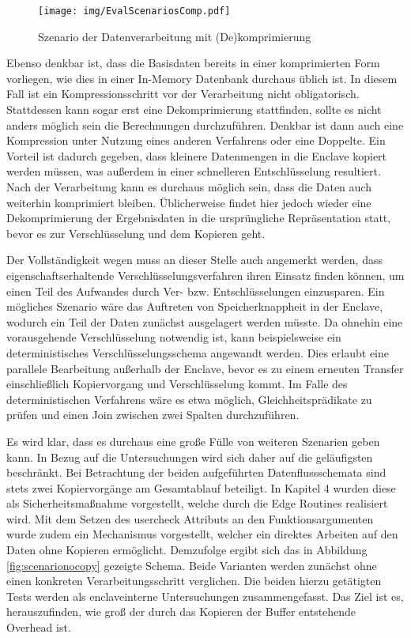 \begin{figure}[h]
	\texttt{[image: img/EvalScenariosComp.pdf]}
	\centering
	\caption{Szenario der Datenverarbeitung mit (De)komprimierung}
	\label{fig:scenariocomp}
\end{figure}

Ebenso denkbar ist, dass die Basisdaten bereits in einer komprimierten Form vorliegen, wie dies in einer In-Memory Datenbank durchaus üblich ist. In diesem Fall ist ein Kompressionsschritt vor der Verarbeitung nicht obligatorisch. Stattdessen kann sogar erst eine Dekomprimierung stattfinden, sollte es nicht anders möglich sein die Berechnungen durchzuführen. Denkbar ist dann auch eine Kompression unter Nutzung eines anderen Verfahrens oder eine Doppelte. Ein Vorteil ist dadurch gegeben, dass kleinere Datenmengen in die Enclave kopiert werden müssen, was außerdem in einer schnelleren Entschlüsselung resultiert. Nach der Verarbeitung kann es durchaus möglich sein, dass die Daten auch weiterhin komprimiert bleiben. Üblicherweise findet hier jedoch wieder eine Dekomprimierung der Ergebnisdaten in die ursprüngliche Repräsentation statt, bevor es zur Verschlüsselung und dem Kopieren geht.

Der Vollständigkeit wegen muss an dieser Stelle auch angemerkt werden, dass eigenschaftserhaltende Verschlüsselungsverfahren ihren Einsatz finden können, um einen Teil des Aufwandes durch Ver- bzw. Entschlüsselungen einzusparen. Ein mögliches Szenario wäre das Auftreten von Speicherknappheit in der Enclave, wodurch ein Teil der Daten zunächst ausgelagert werden müsste. Da ohnehin eine vorausgehende Verschlüsselung notwendig ist, kann beispielsweise ein deterministisches Verschlüsselungsschema angewandt werden. Dies erlaubt eine parallele Bearbeitung außerhalb der Enclave, bevor es zu einem erneuten Transfer einschließlich Kopiervorgang und Verschlüsselung kommt. Im Falle des deterministischen Verfahrens wäre es etwa möglich, Gleichheitsprädikate zu prüfen und einen Join zwischen zwei Spalten durchzuführen. 

Es wird klar, dass es durchaus eine große Fülle von weiteren Szenarien geben kann. In Bezug auf die Untersuchungen wird sich daher auf die geläufigsten beschränkt. Bei Betrachtung der beiden aufgeführten Datenflussschemata sind stets zwei Kopiervorgänge am Gesamtablauf beteiligt. In Kapitel 4 wurden diese als Sicherheitsmaßnahme vorgestellt, welche durch die Edge Routines realisiert wird. Mit dem Setzen des user\textunderscore check Attributs an den Funktionsargumenten wurde zudem ein Mechanismus vorgestellt, welcher ein direktes Arbeiten auf den Daten ohne Kopieren ermöglicht. Demzufolge ergibt sich das in Abbildung \ref{fig:scenarionocopy} gezeigte Schema. Beide Varianten werden zunächst ohne einen konkreten Verarbeitungsschritt verglichen. Die beiden hierzu getätigten Tests werden als enclaveinterne Untersuchungen zusammengefasst. Das Ziel ist es, herauszufinden, wie groß der durch das Kopieren der Buffer entstehende Overhead ist.

